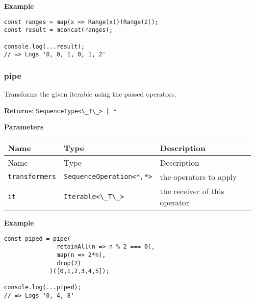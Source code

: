 \textbf{Example}

\begin{lstlisting}[label=4f37aea0-6d8f-468e-826f-2b141d150be7]
const ranges = map(x => Range(x))(Range(2));
const result = mconcat(ranges);
                                            
console.log(...result);
// => Logs '0, 0, 1, 0, 1, 2'
\end{lstlisting}

\hypertarget{de7946de-4204-4528-9d70-80292415d206}{%
\subsubsection{pipe}\label{de7946de-4204-4528-9d70-80292415d206}}

Transforms the given iterable using the passed operators.

\textbf{Returns}: \passthrough{\lstinline!SequenceType<\_T\_> | *!}

\textbf{Parameters}

\begin{longtable}[]{
  >{\raggedright\arraybackslash}p{}
  >{\raggedright\arraybackslash}p{}
  >{\raggedright\arraybackslash}p{}@{}}

\toprule\noalign{}
Name & Type & Description \\
\midrule\noalign{}
\endfirsthead
\toprule\noalign{}
Name & Type & Description \\
\midrule\noalign{}
\endhead
\bottomrule\noalign{}
\endlastfoot
\passthrough{\lstinline!transformers!} &
\passthrough{\lstinline!SequenceOperation<*!}\emph{\passthrough{\lstinline!,*!}}\passthrough{\lstinline!>!}
& the operators to apply \\
\passthrough{\lstinline!it!} & \passthrough{\lstinline!Iterable<\_T\_>!}
& the receiver of this operator \\
\end{longtable}

\textbf{Example}

\begin{lstlisting}[label=389d95f0-7103-4244-a572-b4a0457aa4ae]
const piped = pipe(
               retainAll(n => n % 2 === 0),
               map(n => 2*n),
               drop(2)
             )([0,1,2,3,4,5]);
                                           
console.log(...piped);
// => Logs '0, 4, 8'
\end{lstlisting}

